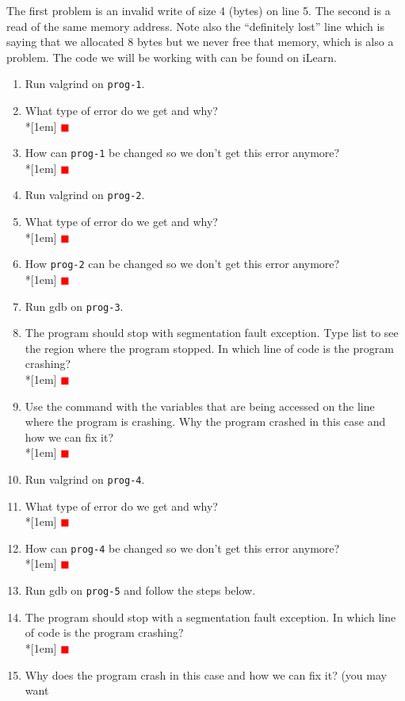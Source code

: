 \documentclass[12pt]{article}
\newcounter{problem}
\newcommand{\TODO}{\textcolor{red}{$\blacksquare$}}
\begin{document}
The first problem is an invalid write of size 4 (bytes) on line 5. The second is
a read of the same memory address. Note also the ``definitely lost'' line which
is saying that we allocated 8 bytes but we never free that memory, which is also
a problem.  The code we will be working with can be found on iLearn.

\begin{enumerate}
\item Run valgrind on \texttt{prog-1}.
\item What type of error do we get and why?\\*[1em]
  \TODO
\item How can \texttt{prog-1} be changed so we don't get this error anymore?\\*[1em]
  \TODO
\item Run valgrind on \texttt{prog-2}.
\item What type of error do we get and why?\\*[1em]
  \TODO
\item How \texttt{prog-2} can be changed so we don't get this error anymore?\\*[1em]
  \TODO
\item Run gdb on \texttt{prog-3}.
\item The program should stop with segmentation fault exception. Type list to
  see the region where the program stopped. In which line of code is the program
  crashing?\\*[1em]
  \TODO
\item Use the command  with the variables that are
  being accessed on the line where the program is crashing. Why the program
  crashed in this case and how we can fix it?\\*[1em]
  \TODO
\item Run valgrind on \texttt{prog-4}.
\item What type of error do we get and why?\\*[1em]
  \TODO
\item How can \texttt{prog-4} be changed so we don't get this error anymore?\\*[1em]
  \TODO
\item Run gdb on \texttt{prog-5} and follow the steps below.
\item The program should stop with a segmentation fault exception. In which line
  of code is the program crashing?\\*[1em]
  \TODO
\item Why does the program crash in this case and how we can fix it? (you may want

\end{enumerate}
\end{document}
